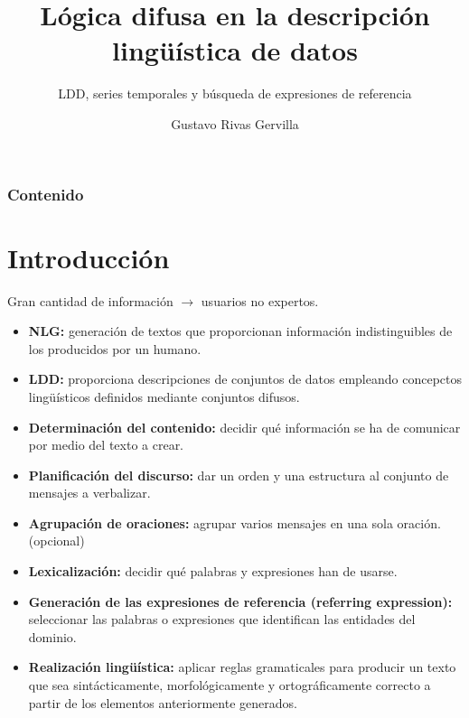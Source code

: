 \documentclass{beamer}
\date{} %
\author{Gustavo Rivas Gervilla}
\title{Lógica difusa en la descripción lingüística de datos}
\subtitle{LDD, series temporales y búsqueda de expresiones de referencia}
\institute{
	Escuela Técnica Superior de Ingeniería Informática y Telecomunicaciones	
}
\begin{document}
	\begin{frame}[plain]
		\titlepage
	\end{frame}
	
	\begin{frame}[plain]
		\frametitle{Contenido}
		\tableofcontents
	\end{frame}
	
	
	\section{Introducción}
	
	\begin{frame}
		Gran cantidad de información $\longrightarrow$ usuarios no expertos.
		
		\begin{itemize}
			\item \textbf{NLG:} generación de textos que proporcionan información indistinguibles de los producidos por un humano.
			\item \textbf{LDD:} proporciona descripciones de conjuntos de datos empleando concepctos lingüísticos definidos mediante conjuntos difusos.
		\end{itemize}		
	\end{frame}
	
	\begin{frame}
		\begin{itemize}
			\item \textbf{Determinación del contenido:} decidir qué información se ha de comunicar por medio del texto a crear.
			\item \textbf{Planificación del discurso:} dar un orden y una estructura al conjunto de mensajes a verbalizar.
			\item \textbf{Agrupación de oraciones:} agrupar varios mensajes en una sola oración. (opcional)
			\item \textbf{Lexicalización:} decidir qué palabras y expresiones han de usarse.
			\item \textbf{Generación de las expresiones de referencia (referring expression):} seleccionar las palabras o expresiones que identifican las entidades del dominio.
			\item \textbf{Realización lingüística:} aplicar reglas gramaticales para producir un texto que sea sintácticamente, morfológicamente y ortográficamente correcto a partir de los elementos anteriormente generados.
\end{itemize}
	\end{frame}
	
\end{document}

